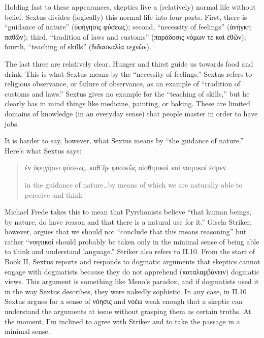 Holding fast to these appearances, skeptics live a (relatively) normal life without belief. Sextus divides (logically) this normal life into four parts. First, there is ``guidance of nature'' (\textgreek{ὑφήγησις φύσεως}); second, ``necessity of feelings'' (\textgreek{ἀνήγκη παθῶν}); third, ``tradition of laws and customs'' (\textgreek{παράδοσις νόμων τε καὶ ἐθῶν}); fourth, ``teaching of skills'' (\textgreek{διδασκαλία τεχνῶν}).

The last three are relatively clear. Hunger and thirst guide us towards food and drink. This is what Sextus means by the ``necessity of feelings.'' Sextus refers to religious observance, or failure of observance, as an example of ``tradition of customs and laws.'' Sextus gives no example for the ``teaching of skills,'' but he clearly has in mind things like medicine, painting, or baking. These are limited domains of knowledge (in an everyday sense) that people master in order to have jobs.

It is harder to say, however, what Sextus means by ``the guidance of nature.'' Here's what Sextus says:
\begin{quote}
    \textgreek{ἐν ὑφηγήσει φύσεως}\dots \textgreek{καθ᾽ἥν φυσικῶς αἰσθητικοὶ καὶ νοητικοί ἐσμεν}

    in the guidance of nature\dots by means of which we are naturally able to perceive and think
\end{quote}
Michael Frede takes this to mean that Pyrrhonists believe ``that human beings, by nature, do have reason and that there is a natural use for it.''\autocite[][95]{frede1988} Gisela Striker, however, argues that we should not ``conclude that this means reasoning'' but rather ``\textgreek{νοητικοί} should probably be taken only in the minimal sense of being able to think and understand language.''\autocite[][119--120, note 7]{striker2001} Striker also refers to II.10. From the start of Book II, Sextus reports and responds to dogmatic arguments that skeptics cannot engage with dogmatists because they do not apprehend (\textgreek{καταλαμβάνειν}) dogmatic views. This argument is something like Meno's paradox, and if dogmatists used it in the way Sextus describes, they were nakedly sophistic. In any case, in II.10 Sextus argues for a sense of \textgreek{νόησις} and \textgreek{νοέω} weak enough that a skeptic can understand the arguments at issue without grasping them as certain truths. At the moment, I'm inclined to agree with Striker and to take the passage in a minimal sense.
